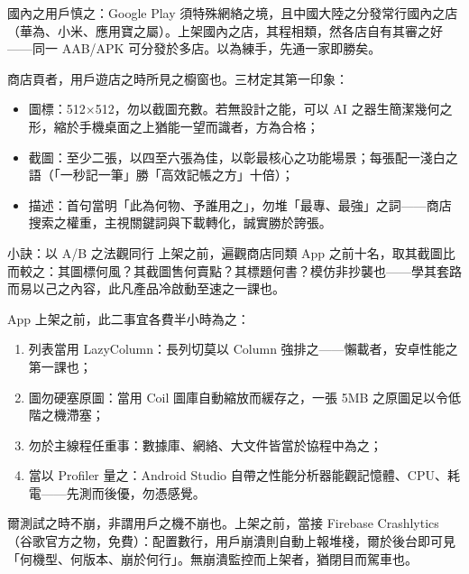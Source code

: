 國內之用戶慎之：Google Play 須特殊網絡之境，且中國大陸之分發常行國內之店（華為、小米、應用寶之屬）。上架國內之店，其程相類，然各店自有其審之好——同一 AAB/APK 可分發於多店。以為練手，先通一家即勝矣。


商店頁者，用戶遊店之時所見之櫥窗也。三材定其第一印象：

\begin{itemize}
  \item 圖標：512×512，勿以截圖充數。若無設計之能，可以 AI 之器生簡潔幾何之形，縮於手機桌面之上猶能一望而識者，方為合格；
  \item 截圖：至少二張，以四至六張為佳，以彰最核心之功能場景；每張配一淺白之語（「一秒記一筆」勝「高效記帳之方」十倍）；
  \item 描述：首句當明「此為何物、予誰用之」，勿堆「最專、最強」之詞——商店搜索之權重，主視關鍵詞與下載轉化，誠實勝於誇張。
\end{itemize}

\begin{tcbinfo}{小訣：以 A/B 之法觀同行}
上架之前，遍觀商店同類 App 之前十名，取其截圖比而較之：其圖標何風？其截圖售何賣點？其標題何書？模仿非抄襲也——學其套路而易以己之內容，此凡產品冷啟動至速之一課也。

\end{tcbinfo}


App 上架之前，此二事宜各費半小時為之：


\begin{enumerate}
  \item 列表當用 LazyColumn：長列切莫以 Column 強排之——懶載者，安卓性能之第一課也；
  \item 圖勿硬塞原圖：當用 Coil 圖庫自動縮放而緩存之，一張 5MB 之原圖足以令低階之機滯塞；
  \item 勿於主線程任重事：數據庫、網絡、大文件皆當於協程中為之；
  \item 當以 Profiler 量之：Android Studio 自帶之性能分析器能觀記憶體、CPU、耗電——先測而後優，勿憑感覺。
\end{enumerate}


爾測試之時不崩，非謂用戶之機不崩也。上架之前，當接 Firebase Crashlytics（谷歌官方之物，免費）：配置數行，用戶崩潰則自動上報堆棧，爾於後台即可見「何機型、何版本、崩於何行」。無崩潰監控而上架者，猶閉目而駕車也。

